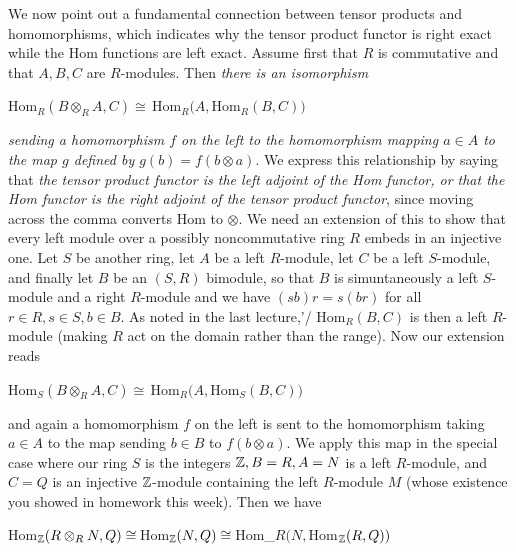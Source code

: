 We now point out a fundamental connection between tensor products and homomorphisms, which indicates why the tensor product functor is right exact while the Hom functions are left exact.  Assume first that $R$ is commutative and that $A,B,C$ are $R$-modules.  Then {\sl there is an isomorphism}

Hom$_R(B\otimes_R A,C)\cong\,$Hom$_R(A,$Hom$_R(B,C))$

{\sl sending a homomorphism $f$ on the left to the homomorphism mapping $a\in A$ to the map $g$ defined by $g(b) = f(b\otimes a)$}.  We express this relationship by saying that {\sl the tensor product functor is the left adjoint of the Hom functor, or that the Hom functor is the right adjoint of the tensor product functor}, since moving across the comma converts Hom to $\otimes$.  We need an extension of this to show that every left module over a possibly noncommutative ring $R$ embeds in an injective one.  Let $S$ be another ring, let $A$ be a left $R$-module, let $C$ be a left $S$-module, and finally let $B$ be an $(S,R)$ bimodule, so that $B$ is simuntaneously a left $S$-module and a right $R$-module and we have $(sb)r = s(br)$ for all $r\in R,s\in S,b\in B$.  As noted in the last lecture,'/
Hom$_R(B,C)$ is then a left $R$-module (making $R$ act on the domain rather than the range).  Now our extension reads

Hom$_S(B\otimes_R A,C)\cong\,$Hom$_R(A,$Hom$_S(B,C))$

and again a homomorphism $f$ on the left is sent to the homomorphism taking $a\in A$ to the map sending $b\in B$ to $f(b\otimes a)$.  We apply this map in the special case where our ring $S$ is the integers $\Bbb Z, B=R, A=N$ is a left $R$-module, and $C=Q$ is an injective $\Bbb Z$-module containing the left $R$-module $M$ (whose existence you showed in homework this week).  Then we have

Hom$_{\Bbb Z}(R\otimes_R N,Q) \cong\,$Hom$_{\Bbb Z}(N,Q)\cong\,$Hom_$R(N,$Hom$_{\Bbb Z} (R,Q))$

